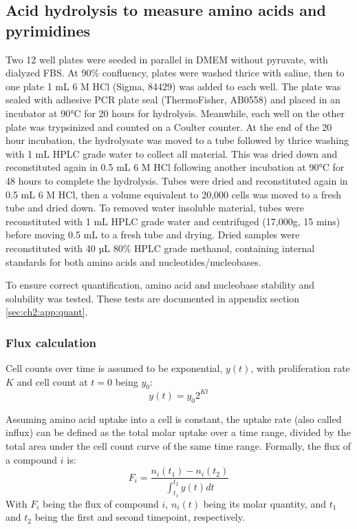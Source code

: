 \subsection{Acid hydrolysis to measure amino acids and pyrimidines}
Two 12 well plates were seeded in parallel in DMEM without pyruvate, with dialyzed FBS.
At 90\% confluency, plates were washed thrice with saline, then to one plate 1 mL 6 M HCl (Sigma, 84429) was added to each well.
The plate was sealed with adhesive PCR plate seal (ThermoFisher, AB0558) and placed in an incubator at 90°C for 20 hours for hydrolysis.
Meanwhile, each well on the other plate was trypsinized and counted on a Coulter counter.
At the end of the 20 hour incubation, the hydrolysate was moved to a tube followed by thrice washing with 1 mL HPLC grade water to collect all material.
This was dried down and reconstituted again in 0.5 mL 6 M HCl following another incubation at 90°C for 48 hours to complete the hydrolysis.
Tubes were dried and reconstituted again in 0.5 mL 6 M HCl, then a volume equivalent to 20,000 cells was moved to a fresh tube and dried down.
To removed water insoluble material, tubes were reconstituted with 1 mL HPLC grade water and centrifuged (17,000g, 15 mins) before moving 0.5 mL to a fresh tube and drying.
Dried samples were reconstituted with 40 µL 80\% HPLC grade methanol, containing internal standards for both amino acids and nucleotides/nucleobases.

To ensure correct quantification, amino acid and nucleobase stability and solubility was tested.
These tests are documented in appendix section \ref{sec:ch2:app:quant}.


\subsubsection{Flux calculation}
Cell counts over time is assumed to be exponential, $y(t)$, with proliferation rate $K$ and cell count at $t=0$ being $y_0$:
\begin{equation}
    y(t) = y_0 2^{K t}
\end{equation}

Assuming amino acid uptake into a cell is constant, the uptake rate (also called influx) can be defined as the total molar uptake over a time range, divided by the total area under the cell count curve of the same time range.
Formally, the flux of a compound $i$ is:
\begin{equation}
    F_i = \frac{n_i(t_1) - n_i(t_2)}{\int_{t_1}^{t_2} y(t) dt}
\end{equation}
With $F_i$ being the flux of compound $i$, $n_i(t)$ being its molar quantity, and $t_1$ and $t_2$ being the first and second timepoint, respectively.

